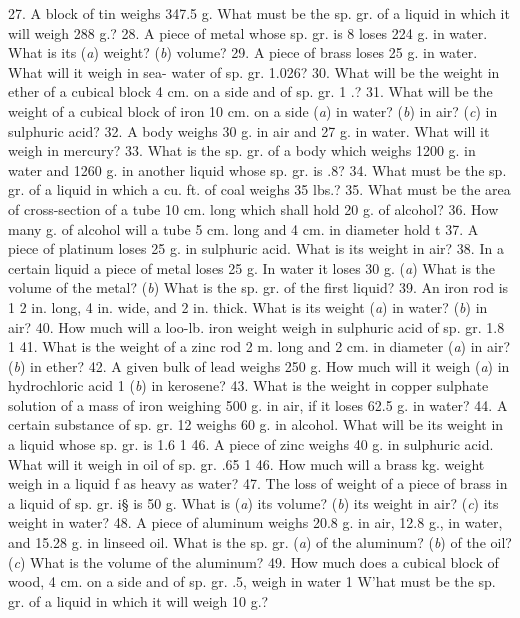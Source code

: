 27. A block of tin weighs 347.5 g. What must be the sp. gr. of a liquid in which it will weigh 288 g.?
28. A piece of metal whose sp. gr. is 8 loses 224 g. in water. What is its (\emph{a}) weight? (\emph{b}) volume?
29. A piece of brass loses 25 g. in water. What will it weigh in sea- water of sp. gr. 1.026?
30. What will be the weight in ether of a cubical block 4 cm. on a side and of sp. gr. 1 .?
31. What will be the weight of a cubical block of iron 10 cm. on a side (\emph{a}) in water? (\emph{b}) in air? (\emph{c}) in sulphuric acid?
32. A body weighs 30 g. in air and 27 g. in water. What will it weigh in mercury?
33. What is the sp. gr. of a body which weighs 1200 g. in water and 1260 g. in another liquid whose sp. gr. is .8?
34. What must be the sp. gr. of a liquid in which a cu. ft. of coal weighs 35 lbs.?
35. What must be the area of cross-section of a tube 10 cm. long which shall hold 20 g. of alcohol?
36. How many g. of alcohol will a tube 5 cm. long and 4 cm. in diameter hold t
37. A piece of platinum loses 25 g. in sulphuric acid. What is its weight in air?
38. In a certain liquid a piece of metal loses 25 g. In water it loses 30 g. (\emph{a}) What is the volume of the metal? (\emph{b}) What is the sp. gr. of the first liquid?
39. An iron rod is 1 2 in. long, 4 in. wide, and 2 in. thick. What is its weight (\emph{a}) in water? (\emph{b}) in air?
40. How much will a loo-lb. iron weight weigh in sulphuric acid of sp. gr. 1.8 1
41. What is the weight of a zinc rod 2 m. long and 2 cm. in diameter (\emph{a}) in air? (\emph{b}) in ether?
42. A given bulk of lead weighs 250 g. How much will it weigh (\emph{a}) in hydrochloric acid 1 (\emph{b}) in kerosene?
43. What is the weight in copper sulphate solution of a mass of iron weighing 500 g. in air, if it loses 62.5 g. in water?
44. A certain substance of sp. gr. 12 weighs 60 g. in alcohol. What will be its weight in a liquid whose sp. gr. is 1.6 1
46. A piece of zinc weighs 40 g. in sulphuric acid. What will it weigh in oil of sp. gr. .65 1
46. How much will a brass kg. weight weigh in a liquid f as heavy as water?
47. The loss of weight of a piece of brass in a liquid of sp. gr. i§ is 50 g. What is (\emph{a}) its volume? (\emph{b}) its weight in air? (\emph{c}) its weight in water?
48. A piece of aluminum weighs 20.8 g. in air, 12.8 g., in water, and 15.28 g. in linseed oil. What is the sp. gr. (\emph{a}) of the aluminum? (\emph{b}) of the oil? (\emph{c}) What is the volume of the aluminum?
49. How much does a cubical block of wood, 4 cm. on a side and of sp. gr. .5, weigh in water 1 W'hat must be the sp. gr. of a liquid in which it will weigh 10 g.?
